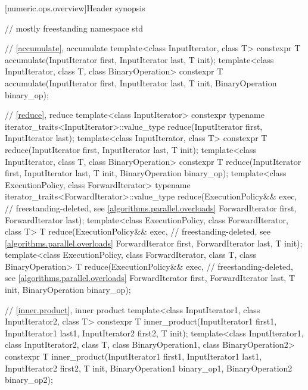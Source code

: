 [numeric.ops.overview]{Header  synopsis}

%
\begin{codeblock}
// mostly freestanding
namespace std {
  // \ref{accumulate}, accumulate
  template<class InputIterator, class T>
    constexpr T accumulate(InputIterator first, InputIterator last, T init);
  template<class InputIterator, class T, class BinaryOperation>
    constexpr T accumulate(InputIterator first, InputIterator last, T init,
                           BinaryOperation binary_op);

  // \ref{reduce}, reduce
  template<class InputIterator>
    constexpr typename iterator_traits<InputIterator>::value_type
      reduce(InputIterator first, InputIterator last);
  template<class InputIterator, class T>
    constexpr T reduce(InputIterator first, InputIterator last, T init);
  template<class InputIterator, class T, class BinaryOperation>
    constexpr T reduce(InputIterator first, InputIterator last, T init,
                       BinaryOperation binary_op);
  template<class ExecutionPolicy, class ForwardIterator>
    typename iterator_traits<ForwardIterator>::value_type
      reduce(ExecutionPolicy&& exec,                            // freestanding-deleted, see \ref{algorithms.parallel.overloads}
             ForwardIterator first, ForwardIterator last);
  template<class ExecutionPolicy, class ForwardIterator, class T>
    T reduce(ExecutionPolicy&& exec,                            // freestanding-deleted, see \ref{algorithms.parallel.overloads}
             ForwardIterator first, ForwardIterator last, T init);
  template<class ExecutionPolicy, class ForwardIterator, class T, class BinaryOperation>
    T reduce(ExecutionPolicy&& exec,                            // freestanding-deleted, see \ref{algorithms.parallel.overloads}
             ForwardIterator first, ForwardIterator last, T init, BinaryOperation binary_op);

  // \ref{inner.product}, inner product
  template<class InputIterator1, class InputIterator2, class T>
    constexpr T inner_product(InputIterator1 first1, InputIterator1 last1,
                              InputIterator2 first2, T init);
  template<class InputIterator1, class InputIterator2, class T,
           class BinaryOperation1, class BinaryOperation2>
    constexpr T inner_product(InputIterator1 first1, InputIterator1 last1,
                              InputIterator2 first2, T init,
                              BinaryOperation1 binary_op1, BinaryOperation2 binary_op2);

}
\end{codeblock}
